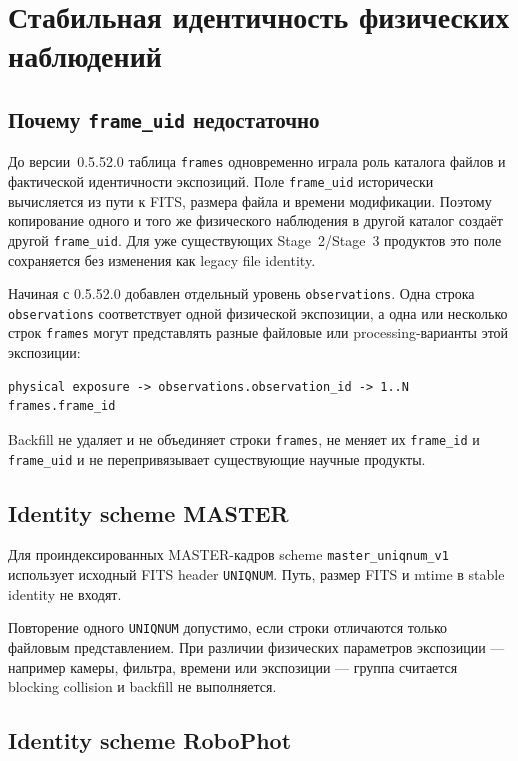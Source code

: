 \chapter{Стабильная идентичность физических наблюдений}

\section{Почему \texttt{frame\_uid} недостаточно}

До версии~0.5.52.0 таблица \texttt{frames} одновременно играла роль каталога файлов и фактической идентичности экспозиций. Поле \texttt{frame\_uid} исторически вычисляется из пути к FITS, размера файла и времени модификации. Поэтому копирование одного и того же физического наблюдения в другой каталог создаёт другой \texttt{frame\_uid}. Для уже существующих Stage~2/Stage~3 продуктов это поле сохраняется без изменения как legacy file identity.

Начиная с 0.5.52.0 добавлен отдельный уровень \texttt{observations}. Одна строка \texttt{observations} соответствует одной физической экспозиции, а одна или несколько строк \texttt{frames} могут представлять разные файловые или processing-варианты этой экспозиции:

\begin{verbatim}
physical exposure -> observations.observation_id -> 1..N frames.frame_id
\end{verbatim}

Backfill не удаляет и не объединяет строки \texttt{frames}, не меняет их \texttt{frame\_id} и \texttt{frame\_uid} и не перепривязывает существующие научные продукты.

\section{Identity scheme MASTER}

Для проиндексированных MASTER-кадров scheme \texttt{master\_uniqnum\_v1} использует исходный FITS header \texttt{UNIQNUM}. Путь, размер FITS и mtime в stable identity не входят.

Повторение одного \texttt{UNIQNUM} допустимо, если строки отличаются только файловым представлением. При различии физических параметров экспозиции --- например камеры, фильтра, времени или экспозиции --- группа считается blocking collision и backfill не выполняется.

\section{Identity scheme RoboPhot}

